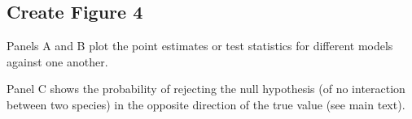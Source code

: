 \documentclass[11pt,]{article}
\newenvironment{Shaded}{\begin{snugshade}}{\end{snugshade}}
\newcommand{\KeywordTok}[1]{\textcolor[rgb]{0.13,0.29,0.53}{\textbf{{#1}}}}
\newcommand{\DataTypeTok}[1]{\textcolor[rgb]{0.13,0.29,0.53}{{#1}}}
\newcommand{\DecValTok}[1]{\textcolor[rgb]{0.00,0.00,0.81}{{#1}}}
\newcommand{\StringTok}[1]{\textcolor[rgb]{0.31,0.60,0.02}{{#1}}}
\newcommand{\NormalTok}[1]{{#1}}
\begin{document}
\begin{Shaded}
\end{Shaded}

\subsection{Create Figure 4}\label{create-figure-4}

Panels A and B plot the point estimates or test statistics for different
models against one another.

Panel C shows the probability of rejecting the null hypothesis (of no
interaction between two species) in the opposite direction of the true
value (see main text).
\end{document}
